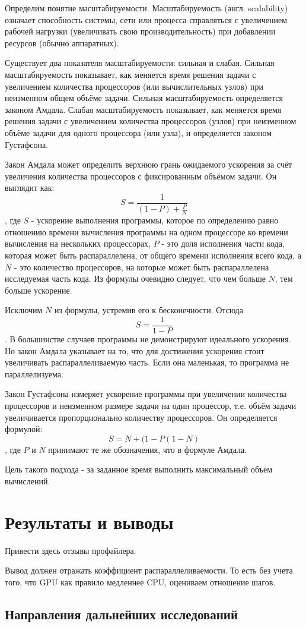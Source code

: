 \documentclass[a4paper,14pt,russian]{extreport}
\begin{document}
Определим понятие масштабируемости. Масштабируемость (англ. scalability) означает способность системы, сети или процесса справляться с увеличением рабочей нагрузки (увеличивать свою производительность) при добавлении ресурсов (обычно аппаратных). 
\par Существует два показателя масштабируемости: сильная и слабая. Сильная масштабируемость показывает, как меняется время решения задачи с увеличением количества процессоров (или вычислительных узлов) при неизменном общем объёме задачи. Сильная масштабируемость определяется законом Амдала. Слабая масштабируемость показывает, как меняется время решения задачи с увеличением количества процессоров (узлов) при неизменном объёме задачи для одного процессора (или узла), и определяется законом Густафсона.
\par Закон Амдала может определить верхнюю грань ожидаемого ускорения за счёт увеличения количества процессоров с фиксированным объёмом задачи. Он выглядит как:
  $$S=\frac{1}{\left(1-P\right)+\frac{P}{N}}$$, где $S$ - ускорение выполнения программы, которое по определению равно отношению времени вычисления программы на одном процессоре ко времени вычисления на нескольких процессорах, $P$ - это доля исполнения части кода, которая может быть распараллелена, от общего времени исполнения всего кода, а $N$ - это количество процессоров, на которые может быть распараллелена исследуемая часть кода. Из формулы очевидно следует, что чем больше $N$, тем больше ускорение.
\par Исключим $N$ из формулы, устремив его к бесконечности. Отсюда $$S = \frac{1}{1-P}$$. В большинстве случаев программы не демонстрируют идеального ускорения. Но закон Амдала указывает на то, что для достижения ускорения стоит увеличивать распараллеливаемую часть. Если она маленькая, то программа не параллелизуема.
\par Закон Густафсона измеряет ускорение программы при увеличении количества процессоров и неизменном размере задачи на один процессор, т.е. объём задачи увеличивается пропорционально количеству процессоров. Он определяется формулой: $$S=N+(1-P(1-N)$$, где $P$ и $N$ принимают те же обозначения, что в формуле Амдала. 
\par Цель такого подхода - за заданное время выполнить максимальный объем вычислений.


\chapter{Результаты и выводы}

Привести здесь отзывы профайлера.
\par Вывод должен отражать коэффициент распараллеливаемости. То есть без учета того, что GPU как правило медленнее CPU, оцениваем отношение шагов. 


\section{Направления дальнейших исследований}



 
\end{document}
